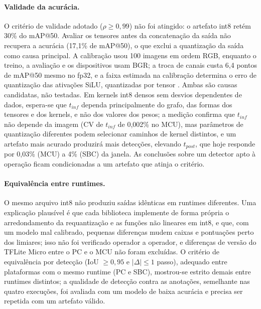 \documentclass[11pt,a4paper]{article}
\begin{document}
\paragraph{Validade da acurácia.} O critério de validade adotado ($\rho\geq0{,}99$) não foi atingido: o artefato
int8 retém 30\% do mAP@50. Avaliar os tensores antes da concatenação da saída não recupera a acurácia (17,1\% de
mAP@50), o que exclui a quantização da saída como causa principal. A calibração usou 100 imagens em ordem RGB,
enquanto o treino, a avaliação e os dispositivos usam BGR; a troca de canais custa 6,4 pontos de mAP@50 mesmo no
fp32, e a faixa estimada na calibração determina o erro de quantização das ativações SiLU, quantizadas por tensor
\cite{gholami2022survey}.
Ambas são causas candidatas, não testadas. Em kernels int8 densos sem desvios dependentes de dados, espera-se que
$t_{inf}$ dependa principalmente do grafo, das formas dos tensores e dos kernels, e não dos valores dos pesos; a
medição confirma que $t_{inf}$ não depende da imagem (CV de $t_{inf}$ de 0,002\% no MCU), mas parâmetros de quantização
diferentes podem selecionar caminhos de kernel distintos, e um artefato mais acurado produzirá mais detecções,
elevando $t_{post}$, que hoje responde por 0,03\% (MCU) a 4\% (SBC) da janela. As conclusões sobre um detector apto
à operação ficam condicionadas a um artefato que atinja o critério.

\paragraph{Equivalência entre runtimes.} O mesmo arquivo int8 não produziu saídas idênticas em runtimes
diferentes. Uma explicação plausível é que cada biblioteca implemente de forma própria o arredondamento da
requantização e as funções não lineares em int8, e que, com um modelo mal calibrado, pequenas diferenças mudem
caixas e pontuações perto dos limiares; isso não foi verificado operador a operador, e diferenças de versão do
TFLite Micro entre o PC e o MCU não foram excluídas. O critério de equivalência por detecção (IoU $\geq0{,}95$ e
$|\Delta|\leq1$ passo), adequado entre plataformas com o mesmo runtime (PC e SBC), mostrou-se estrito demais entre
runtimes distintos; a qualidade de detecção contra as anotações, semelhante nas quatro execuções, foi avaliada com
um modelo de baixa acurácia e precisa ser repetida com um artefato válido.
\end{document}
